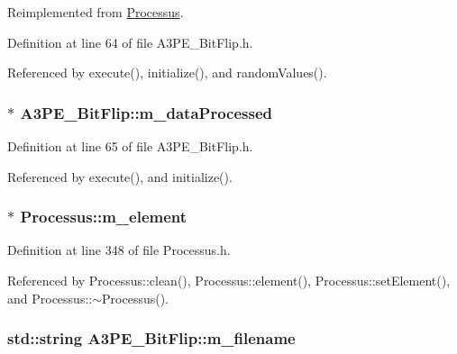 Reimplemented from \hyperlink{classProcessus_a3da9a9de8af54e2f47807a3e09dfccff}{Processus}.

Definition at line 64 of file A3PE\_\-BitFlip.h.

Referenced by execute(), initialize(), and randomValues().\hypertarget{classA3PE__BitFlip_a5e64d319904fc8a6fe70b92afcf6ef4f}{
\subsubsection[{m\_\-dataProcessed}]{$\ast$ {\bf A3PE\_\-BitFlip::m\_\-dataProcessed}}}
\label{classA3PE__BitFlip_a5e64d319904fc8a6fe70b92afcf6ef4f}


Definition at line 65 of file A3PE\_\-BitFlip.h.

Referenced by execute(), and initialize().\hypertarget{classProcessus_aa9d24d53c3e52f36786cabb5d8e296e7}{
\subsubsection[{m\_\-element}]{$\ast$ {\bf Processus::m\_\-element}}}
\label{classProcessus_aa9d24d53c3e52f36786cabb5d8e296e7}


Definition at line 348 of file Processus.h.

Referenced by Processus::clean(), Processus::element(), Processus::setElement(), and Processus::$\sim$Processus().\hypertarget{classA3PE__BitFlip_a72eecaff11d66c7f3eee10a9b2bfa301}{
\subsubsection[{m\_\-filename}]{\setlength{\rightskip}{0pt plus 5cm}std::string {\bf A3PE\_\-BitFlip::m\_\-filename}}}
\label{classA3PE__BitFlip_a72eecaff11d66c7f3eee10a9b2bfa301}


